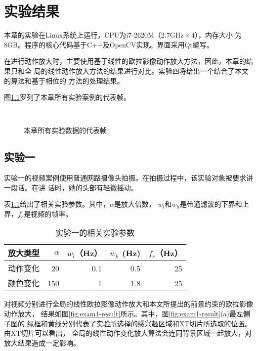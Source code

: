 \chapter{实验结果}
\label{chap:results}

本章的实验在Linux系统上运行，CPU为i7-2620M（$2.7\mbox{GHz}\times 4$），内存大小
为8GB。程序的核心代码基于C++及OpenCV实现。界面采用Qt编写。

在进行动作放大时，主要使用基于线性的欧拉影像动作放大方法，因此，本章的结果只和全
局的线性动作放大方法的结果进行对比。实验四将给出一个结合了本文的算法和基于相位的
方法的处理结果。

图\ref{fig:all-videos}罗列了本章所有实验案例的代表帧。

\begin{figure}[htbp]
  \centering
  \qquad
  \\
  \qquad
  \caption{本章所有实验数据的代表帧}
  \label{fig:all-videos}
\end{figure}

\section{实验一}
\label{sec:exam1}

实验一的视频案例使用普通网路摄像头拍摄。在拍摄过程中，该实验对象被要求讲一段话。在讲
话时，她的头部有轻微摇动。

表\ref{tab:exam1-data}给出了相关实验参数。其中，$\alpha$是放大倍数，
$w_l$和$w_h$是带通滤波的下界和上界，$f_s$是视频的帧率。

\begin{table}[htbp]
  \centering
  \caption{实验一的相关实验参数}
  \label{tab:exam1-data}
  \begin{tabular}[c]{crrrr}
    \toprule[1.5pt]
    放大类型 & $\alpha$ & $w_l$（Hz） & $w_h$ (Hz) & $f_s$（Hz）\\
    \midrule
    动作变化 & 20 & 0.1 & 0.5 & 25 \\
    颜色变化 & 150 & 1 & 1.8 & 25 \\
    \bottomrule[1.5pt]
  \end{tabular}
\end{table}

对视频分别进行全局的线性欧拉影像动作放大和本文所提出的前景约束的欧拉影像动作放大，
结果如图\ref{fig:exam1-result}所示。其中，图\ref{fig:exam1-result}(a)最左侧子图的
绿框和黄线分别代表了实验所选择的感兴趣区域和XT切片所选取的位置。由XT切片可以看出，
全局的线性动作变化放大算法会连同背景区域一起放大，对放大结果造成一定影响。

